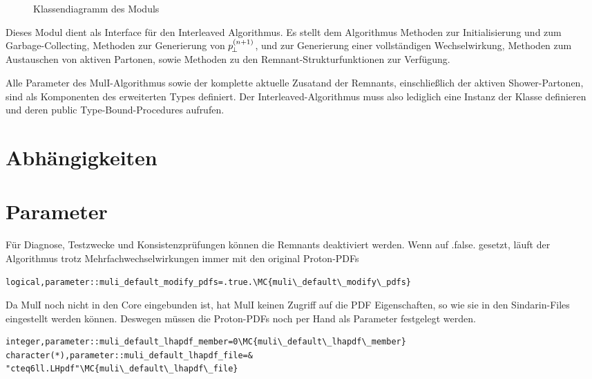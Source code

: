 \begin{figure}
  \caption{\label{fig:\ThisModule:Types}Klassendiagramm des Moduls \ThisModule}
\end{figure}
Dieses Modul dient als Interface für den Interleaved Algorithmus. Es stellt dem Algorithmus Methoden zur Initialisierung und zum Garbage-Collecting, Methoden zur Generierung von $p_{\!\perp}^{(n+1)}$, und zur Generierung einer vollständigen Wechselwirkung, Methoden zum Austauschen von aktiven Partonen, sowie Methoden zu den Remnant-Strukturfunktionen zur Verfügung.

Alle Parameter des MulI-Algorithmus sowie der komplette aktuelle Zusatand der Remnants, einschließlich der aktiven Shower-Partonen, sind als Komponenten des erweiterten Types  definiert. Der Interleaved-Algorithmus muss also lediglich eine Instanz der Klasse  definieren und deren public Type-Bound-Procedures aufrufen.

\section{Abhängigkeiten}
\section{Parameter}
Für Diagnose, Testzwecke und Konsistenzprüfungen können die Remnants deaktiviert werden. Wenn auf .false. gesetzt, läuft der Algorithmus trotz Mehrfachwechselwirkungen immer mit den original Proton-PDFs
\begin{Verbatim}
logical,parameter::muli_default_modify_pdfs=.true.\MC{muli\_default\_modify\_pdfs}
\end{Verbatim}
Da MulI noch nicht in den Core eingebunden ist, hat MulI keinen Zugriff auf die PDF Eigenschaften, so wie sie in den Sindarin-Files eingestellt werden können. Deswegen müssen die Proton-PDFs noch per Hand als Parameter festgelegt werden.
\begin{Verbatim}
integer,parameter::muli_default_lhapdf_member=0\MC{muli\_default\_lhapdf\_member}
character(*),parameter::muli_default_lhapdf_file=&
"cteq6ll.LHpdf"\MC{muli\_default\_lhapdf\_file}
\end{Verbatim}

